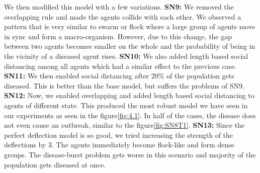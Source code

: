 \documentclass[a4paper,11pt]{article}
\begin{document}
    We then modified this model with a few variations.
    \textbf{SN9:} We removed the overlapping rule and made the agents collide with each other.
    We observed a pattern that is very similar to swarm or flock where a large group of agents move in sync and form a macro-organism.
    However, due to this change, the gap between two agents becomes smaller on the whole and the probability of being in the vicinity of a diseased agent rises.
    \textbf{SN10:} We also added length based social distancing among all agents which had a similar effect to the previous case.
    \textbf{SN11:} We then enabled social distancing after 20\% of the population gets diseased\cite{3b1b}.
    This is better than the base model, but suffers the problems of SN9.
    \textbf{SN12:} Now, we enabled overlapping and added length based social distancing to agents of different state.
    This produced the most robust model we have seen in our experiments as seen in the figure\ref{fig:4.1}.
    In half of the cases, the disease does not even cause an outbreak, similar to the figure\ref{fig:SN8T1}.
    \textbf{SN13:} Since the perfect deflection model is so good, we tried increasing the strength of the deflections by 3.
    The agents immediately become flock-like and form dense groups.
    The disease-burst problem gets worse in this scenario and majority of the population gets diseased at once.
\end{document}
